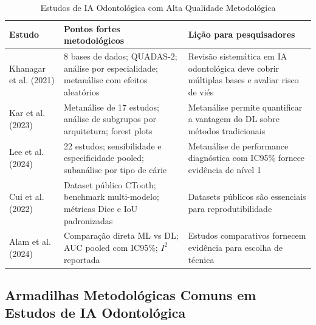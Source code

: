 \begin{table}[H]
  \centering
  \caption{Estudos de IA Odontológica com Alta Qualidade Metodológica}
  \label{tab:estudos-exemplares}
  \small
  \begin{tabularx}{\textwidth}{p{3cm}XX}
    \toprule
    \textbf{Estudo} & \textbf{Pontos fortes metodológicos} & \textbf{Lição para pesquisadores} \\
    \midrule
    Khanagar et al. (2021) \cite{ODT-001} & 8 bases de dados; QUADAS-2; análise por especialidade; metanálise com efeitos aleatórios & Revisão sistemática em IA odontológica deve cobrir múltiplas bases e avaliar risco de viés \\
    Kar et al. (2023) \cite{ODT-010} & Metanálise de 17 estudos; análise de subgrupos por arquitetura; forest plots & Metanálise permite quantificar a vantagem do DL sobre métodos tradicionais \\
    Lee et al. (2024) \cite{ODT-016} & 22 estudos; sensibilidade e especificidade pooled; subanálise por tipo de cárie & Metanálise de performance diagnóstica com IC95\% fornece evidência de nível 1 \\
    Cui et al. (2022) \cite{ODT-030} & Dataset público CTooth; benchmark multi-modelo; métricas Dice e IoU padronizadas & Datasets públicos são essenciais para reprodutibilidade \\
    Alam et al. (2024) \cite{ODT-015} & Comparação direta ML vs DL; AUC pooled com IC95\%; $I^2$ reportada & Estudos comparativos fornecem evidência para escolha de técnica \\
    \bottomrule
  \end{tabularx}
\end{table}

\subsection{Armadilhas Metodológicas Comuns em Estudos de IA Odontológica}


